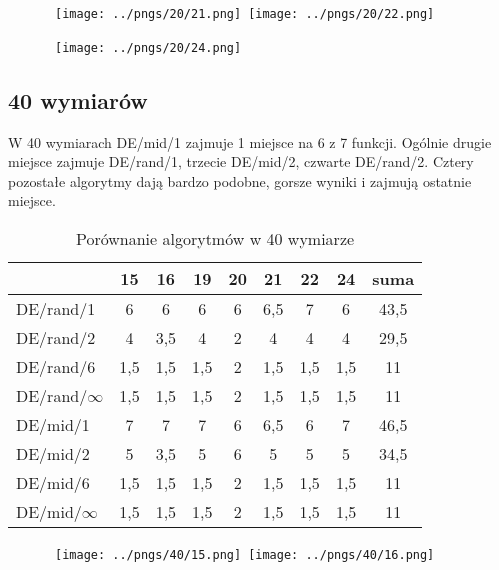 \begin{figure}[H]
\centering
\mbox{
\texttt{[image: ../pngs/20/21.png]} \quad
\texttt{[image: ../pngs/20/22.png]} 
}
\end{figure}

\begin{figure}[H]
\centering
\mbox{
\texttt{[image: ../pngs/20/24.png]} \quad
}
\end{figure}

\subsection{40 wymiarów}

W 40 wymiarach DE/mid/1 zajmuje 1 miejsce na 6 z 7 funkcji. Ogólnie drugie miejsce zajmuje DE/rand/1,
trzecie DE/mid/2, czwarte DE/rand/2. Cztery pozostałe algorytmy dają bardzo podobne, gorsze
wyniki i zajmują ostatnie miejsce.

\begin{table}[H]
\centering
\begin{tabular}{ l | c | c | c | c | c | c | c | c}
                 & 15  & 16  & 19  & 20  & 21  & 22  & 24  & suma \\ \hline
DE/rand/1        & 6   & 6   & 6   & 6   & 6,5 & 7   & 6   & 43,5 \\ 
DE/rand/2        & 4   & 3,5 & 4   & 2   & 4   & 4   & 4   & 29,5 \\ 
DE/rand/6        & 1,5 & 1,5 & 1,5 & 2   & 1,5 & 1,5 & 1,5 & 11   \\ 
DE/rand/$\infty$ & 1,5 & 1,5 & 1,5 & 2   & 1,5 & 1,5 & 1,5 & 11   \\ 
DE/mid/1         & 7   & 7   & 7   & 6   & 6,5 & 6   & 7   & 46,5 \\
DE/mid/2         & 5   & 3,5 & 5   & 6   & 5   & 5   & 5   & 34,5 \\
DE/mid/6         & 1,5 & 1,5 & 1,5 & 2   & 1,5 & 1,5 & 1,5 & 11   \\ 
DE/mid/$\infty$  & 1,5 & 1,5 & 1,5 & 2   & 1,5 & 1,5 & 1,5 & 11   \\
\end{tabular}
\caption{Porównanie algorytmów w 40 wymiarze}
\label{table:40d}
\end{table}

\begin{figure}[H]
\centering
\mbox{
\texttt{[image: ../pngs/40/15.png]} \quad
\texttt{[image: ../pngs/40/16.png]} 
}
\end{figure}

